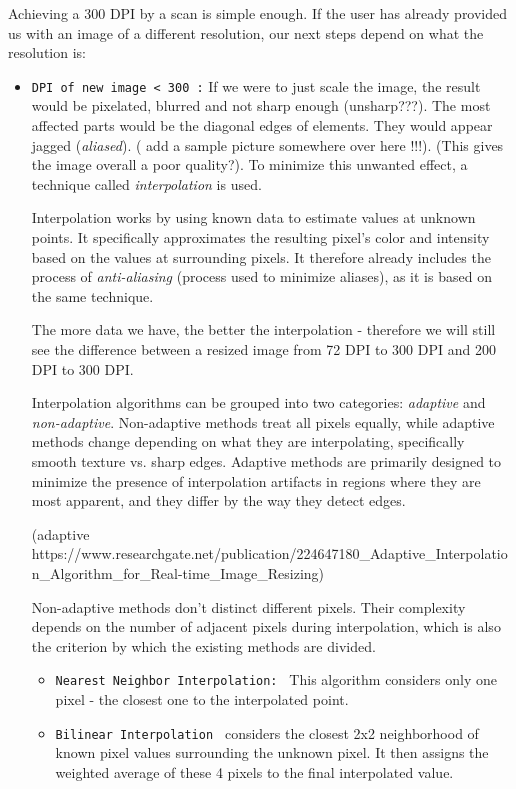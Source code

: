 Achieving a 300 DPI by a scan is simple enough. If the user has already provided us with an image of a different resolution, our next steps depend on what the resolution is:
\begin{itemize}
\item\texttt {DPI of new image < 300 :} If we were to just scale the image, the result would be pixelated, blurred and not sharp enough (unsharp???). The most affected parts would be the diagonal edges of elements. They would appear jagged (\emph{aliased}). ( add a sample picture somewhere over here !!!). (This gives the image overall a poor quality?). To minimize this unwanted effect, a technique called \emph{interpolation} is used.

Interpolation works by using known data to estimate values at unknown points. It specifically approximates the resulting pixel's color and intensity based on the values at surrounding pixels. It therefore already includes the process of \emph{anti-aliasing} (process used to minimize aliases), as it is based on the same technique.

The more data we have, the better the interpolation - therefore we will still see the difference between a resized image from 72 DPI to 300 DPI and 200 DPI to 300 DPI.

Interpolation algorithms can be grouped into two categories: \emph{adaptive} and \emph{non-adaptive}. Non-adaptive methods treat all pixels equally, while adaptive methods change depending on what they are interpolating, specifically smooth texture vs. sharp edges. Adaptive methods are primarily designed to minimize the presence of interpolation artifacts in regions where they are most apparent, and they differ by the way they detect edges.

(adaptive https://www.researchgate.net/publication/224647180_Adaptive_Interpolation_Algorithm_for_Real-time_Image_Resizing)

Non-adaptive methods don't distinct different pixels. Their complexity depends on the number of adjacent pixels during interpolation, which is also the criterion by which the existing methods are divided. 

\begin{itemize}
\item\texttt {Nearest Neighbor Interpolation: } This algorithm considers only one pixel - the closest one to the interpolated point.

\item\texttt {Bilinear Interpolation } considers the closest 2x2 neighborhood of known pixel values surrounding the unknown pixel. It then assigns the weighted average of these 4 pixels to the final interpolated value.


\end{itemize}
\end{itemize}
